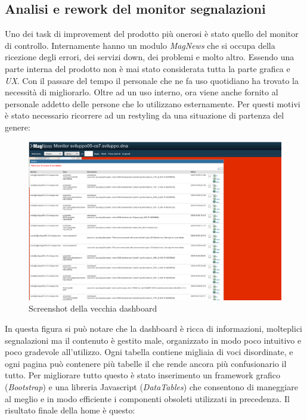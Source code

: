 \documentclass[a4paper]{article}
\begin{document}
\subsection{Analisi e rework del monitor segnalazioni}
\par Uno dei task di improvement del prodotto più onerosi è stato quello del monitor di controllo.
Internamente hanno un modulo \emph{MagNews} che si occupa della ricezione degli errori,
dei servizi down, dei problemi e molto altro. Essendo una parte interna del prodotto
non è mai stato considerata tutta la parte grafica e \emph{UX}. Con il passare del tempo
il personale che ne fa uso quotidiano ha trovato la necessità di migliorarlo.
Oltre ad un uso interno, ora viene anche fornito al personale addetto delle persone che
lo utilizzano esternamente. Per questi motivi è stato necessario ricorrere ad un restyling
da una situazione di partenza del genere:
\begin{figure}[H]
	\includegraphics[width=\textwidth]{dashboard_old.png}
	\centering
	\caption{Screenshot della vecchia dashboard}
\end{figure}
In questa figura si può notare che la dashboard è ricca di informazioni, molteplici segnalazioni
ma il contenuto è gestito male, organizzato in modo poco intuitivo e poco gradevole all'utilizzo.
Ogni tabella contiene migliaia di voci disordinate, e ogni pagina può contenere più tabelle
il che rende ancora più confusionario il tutto. Per migliorare tutto questo è stato inserimento
un framework grafico (\emph{Bootstrap}) e una libreria Javascript (\emph{DataTables}) che consentono
di maneggiare al meglio e in modo efficiente i componenti obsoleti utilizzati in precedenza.
Il risultato finale della home è questo:
\end{document}

